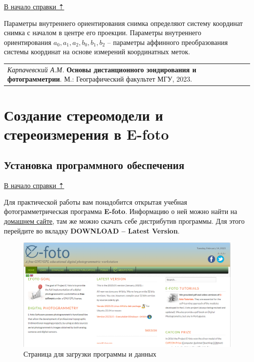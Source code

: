 \documentclass[
  12pt,
]{book}
\begin{document}
\protect\hyperlink{photogrammetry}{В начало справки ⇡}

Параметры внутреннего ориентирования снимка определяют систему координат снимка с началом в центре его проекции. Параметры внутреннего ориентирования \(a_{0}, a_{1}, a_{2}, b_{0}, b_{1}, b_{2}\) -- параметры аффинного преобразования системы координат на основе измерений координатных меток.

\begin{longtable}[]{@{}l@{}}
\toprule\noalign{}
\endhead
\bottomrule\noalign{}
\endlastfoot
\emph{Карпачевский А.М.} \textbf{Основы дистанционного зондирования и фотограмметрии}. М.: Географический факультет МГУ, 2023. \\
\end{longtable}

\hypertarget{stereo}{%
\chapter{Создание стереомодели и стереоизмерения в E-foto}\label{stereo}}

\hypertarget{stereo-soft}{%
\section{Установка программного обеспечения}\label{stereo-soft}}

\protect\hyperlink{stereo}{В начало справки ⇡}

Для практической работы вам понадобится открытая учебная фотограмметрическая программа \textbf{E-foto}. Информацию о ней можно найти на \href{http://www.efoto.eng.uerj.br/}{домашнем сайте}, там же можно скачать себе дистрибутив программы. Для этого перейдите во вкладку \textbf{DOWNLOAD -- Latest Version}.

\begin{figure}
\centering
\includegraphics{images/Ref13/Download.png}
\caption{Страница для загрузки программы и данных}
\end{figure}
\end{document}
